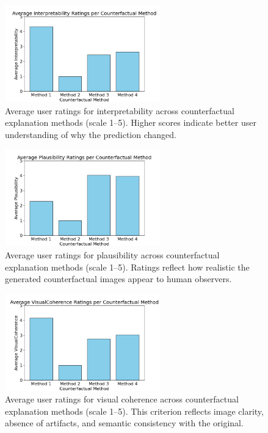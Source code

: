 \begin{figure}[h]
    \centering
    \includegraphics[width=0.6\textwidth]{img/human_rating_results/Interpretability_ratings.png}
    \caption[User-rated interpretability scores by method]{%
Average user ratings for interpretability across counterfactual explanation methods (scale 1–5). Higher scores indicate better user understanding of why the prediction changed.}
    \label{fig:cf_interpretability}
\end{figure}

\begin{figure}[h]
    \centering
    \includegraphics[width=0.6\textwidth]{img/human_rating_results/Plausibility_ratings.png}
    \caption[User-rated plausibility scores by method]{%
Average user ratings for plausibility across counterfactual explanation methods (scale 1–5). Ratings reflect how realistic the generated counterfactual images appear to human observers.}
    \label{fig:cf_plausibility}
\end{figure}

\begin{figure}[h]
    \centering
    \includegraphics[width=0.6\textwidth]{img/human_rating_results/VisualCoherence_ratings.png}
    \caption[User-rated visual coherence scores by method]{%
Average user ratings for visual coherence across counterfactual explanation methods (scale 1–5). This criterion reflects image clarity, absence of artifacts, and semantic consistency with the original.}
    \label{fig:cf_visualcoherence}
\end{figure}

